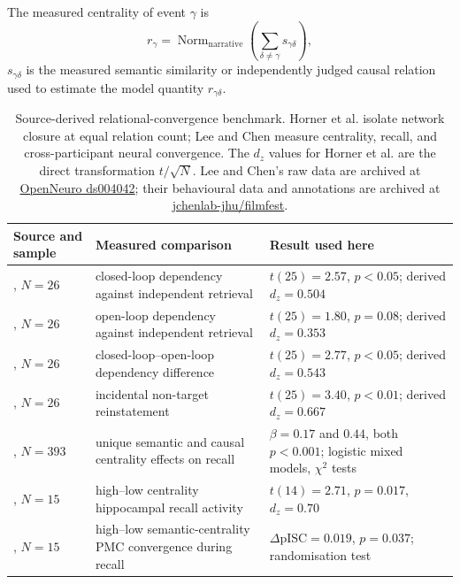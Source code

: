 The measured centrality of event $\gamma$ is \citep{leechen2022}
\begin{equation}
  r_\gamma=
  \operatorname{Norm}_{\mathrm{narrative}}\!\left(
    \sum_{\delta\neq\gamma}s_{\gamma\delta}
  \right),
  \label{eq:measured_relational_centrality}
\end{equation}
\noindent$s_{\gamma\delta}$ is the measured semantic similarity or independently
judged causal relation used to estimate the model quantity $r_{\gamma\delta}$.

\begin{table}[H]
\centering
\footnotesize
\begin{tabular}{@{}
  >{\raggedright\arraybackslash}p{3.0cm}
  >{\raggedright\arraybackslash}p{5.5cm}
  >{\raggedright\arraybackslash}p{4.2cm}@{}}
\toprule
Source and sample & Measured comparison & Result used here \\
\midrule
\citet{horner2015}, $N=26$ & closed-loop dependency against independent retrieval & $t(25)=2.57$, $p<0.05$; derived $d_z=0.504$ \\
\citet{horner2015}, $N=26$ & open-loop dependency against independent retrieval & $t(25)=1.80$, $p=0.08$; derived $d_z=0.353$ \\
\citet{horner2015}, $N=26$ & closed-loop--open-loop dependency difference & $t(25)=2.77$, $p<0.05$; derived $d_z=0.543$ \\
\citet{horner2015}, $N=26$ & incidental non-target reinstatement & $t(25)=3.40$, $p<0.01$; derived $d_z=0.667$ \\
\citet{leechen2022}, $N=393$ & unique semantic and causal centrality effects on recall & $\beta=0.17$ and $0.44$, both $p<0.001$; logistic mixed models, $\chi^2$ tests \\
\citet{leechen2022}, $N=15$ & high--low centrality hippocampal recall activity & $t(14)=2.71$, $p=0.017$, $d_z=0.70$ \\
\citet{leechen2022}, $N=15$ & high--low semantic-centrality PMC convergence during recall & $\Delta\mathrm{pISC}=0.019$, $p=0.037$; randomisation test \\
\bottomrule
\end{tabular}
\caption{Source-derived relational-convergence benchmark. Horner et al. isolate
network closure at equal relation count; Lee and Chen measure centrality, recall, and
cross-participant neural convergence. The $d_z$ values for Horner et al. are the
direct transformation $t/\sqrt{N}$. Lee and Chen's raw data are archived at
\href{https://doi.org/10.18112/openneuro.ds004042.v1.0.0}{OpenNeuro ds004042}; their
behavioural data and annotations are archived at
\href{https://github.com/jchenlab-jhu/filmfest}{jchenlab-jhu/filmfest}.}
\label{tab:relational_convergence_data}
\end{table}

